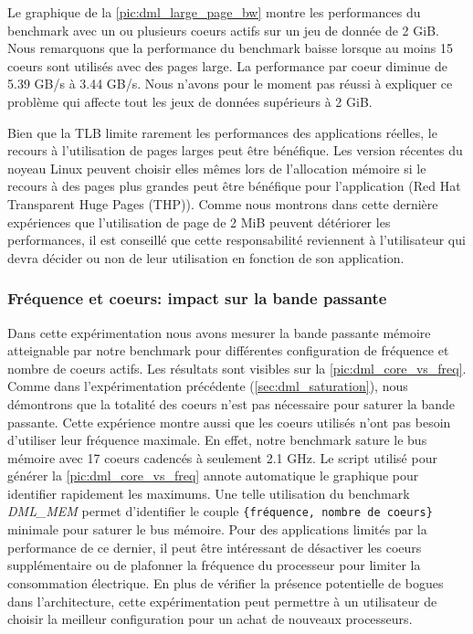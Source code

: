     Le graphique de la \autoref{pic:dml_large_page_bw} montre les performances du benchmark avec un ou plusieurs coeurs actifs sur un jeu de donnée de 2 GiB. Nous remarquons que la performance du benchmark baisse lorsque au moins 15 coeurs sont utilisés avec des pages large. La performance par coeur diminue de 5.39 GB/s à 3.44 GB/s. Nous n'avons pour le moment pas réussi à expliquer ce problème qui affecte tout les jeux de données supérieurs à 2 GiB.
    
    Bien que la TLB limite rarement les performances des applications réelles, le recours à l'utilisation de pages larges peut être bénéfique. Les version récentes du noyeau Linux peuvent choisir elles mêmes lors de l'allocation mémoire si le recours à des pages plus grandes peut être bénéfique pour l'application (Red Hat Transparent Huge Pages (THP)). Comme nous montrons dans cette dernière expériences que l'utilisation de page de 2 MiB peuvent détériorer les performances, il est conseillé que cette responsabilité reviennent à l'utilisateur qui devra décider ou non de leur utilisation en fonction de son application. 
  


    
    \subsubsection{Fréquence et coeurs: impact sur la bande passante} \label{sec:dml_core_vs_freq}
    
    Dans cette expérimentation nous avons mesurer la bande passante mémoire atteignable par notre benchmark pour différentes configuration de fréquence et nombre de coeurs actifs. Les résultats sont visibles sur la \autoref{pic:dml_core_vs_freq}. Comme dans l'expérimentation précédente (\autoref{sec:dml_saturation}), nous démontrons que la totalité des coeurs n'est pas nécessaire pour saturer la bande passante. Cette expérience montre aussi que les coeurs utilisés n'ont pas besoin d'utiliser leur fréquence maximale. En effet, notre benchmark sature le bus mémoire avec 17 coeurs cadencés à seulement 2.1 GHz. Le script utilisé pour générer la \autoref{pic:dml_core_vs_freq} annote automatique le graphique pour identifier rapidement les maximums. Une telle utilisation du benchmark \textit{DML\_MEM} permet d'identifier le couple  \verb|{fréquence, nombre de coeurs}| minimale pour saturer le bus mémoire. Pour des applications limités par la performance de ce dernier, il peut être intéressant de désactiver les coeurs supplémentaire ou de plafonner la fréquence du processeur pour limiter la consommation électrique. En plus de vérifier la présence potentielle de bogues dans l'architecture, cette expérimentation peut permettre à un utilisateur de choisir la meilleur configuration pour un achat de nouveaux processeurs. 
    
